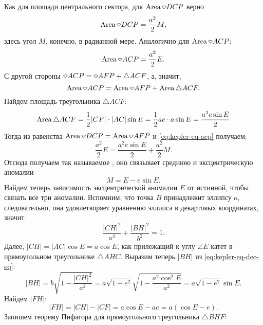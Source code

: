 Как для площади центрального сектора, для $\area \sector DCP$ верно
\begin{equation*}
	\area \sector DCP = \frac{a^2}{2} M,
\end{equation*}
здесь угол $M$, конечно, в радианной мере. Аналогично для $\area \sector ACP$:
\begin{equation*}
	\area \sector ACP = \frac{a^2}{2} E.
\end{equation*}
С другой стороны $\sector ACP = \sector AFP + \triangle ACF$, а, значит,
\begin{equation}
	\area \sector ACP = \area\sector AFP + \area\triangle ACF.
	\label{eq:kepler-eq-acp}
\end{equation}
Найдем площадь треугольника $\triangle ACF$:
\begin{equation*}
	\operatorname{Area} \triangle ACF = \frac{1}{2} |CF| \cdot |AC| \sin E = \frac{1}{2} a e \cdot a \sin E =  \frac{a^2 e\sin E}{2}
\end{equation*}
Тогда из равенства $\area \sector DCP = \area \sector AFP$ и \eqref{eq:kepler-eq-acp} получаем:
\begin{equation*}
	\frac{a^2}{2} E = \frac{a^2 e\sin E}{2} + \frac{a^2}{2} M.
\end{equation*}
Отсюда получаем так называемое , оно связывает среднюю и эксцентрическую аномалии
\begin{equation}\label{eq:kepler-eq}
	M = E - e \sin E.
\end{equation}
Найдем теперь зависимость эксцентрической аномалии $E$ от истинной, чтобы связать все три аномалии. Вспомним, что точка $B$ принадлежит эллипсу $o$, следовательно, она удовлетворяет уравнению эллипса в декартовых координатах, значит
\begin{equation}
	\frac{|CH|^2}{a^2} + \frac{|BH|^2}{b^2} = 1.
	\label{eq:kepler-eq-dec-eq}
\end{equation}
Далее, $|CH| = |AC| \cos E = a \cos E$, как прилежащий к углу $\angle E$ катет в прямоугольном треугольнике $\triangle AHC$. Выразим теперь $|BH|$ из \eqref{eq:kepler-eq-dec-eq}:
\begin{equation*}
	|BH| = b\sqrt{1 - \frac{|CH|^2}{a^2}} = a \sqrt{1 - e^2} \sqrt{1 - \frac{a^2 \cos^2 E}{a^2}} = a \sqrt{1 - e^2} \sin E .
\end{equation*}
Найдем $|FH|$:
\begin{equation*}
	|FH| = |CH| - |CF| = a \cos E - a e = a (\cos E - e).
\end{equation*}
Запишем теорему Пифагора для прямоугольного треугольника $\triangle BHF$:

